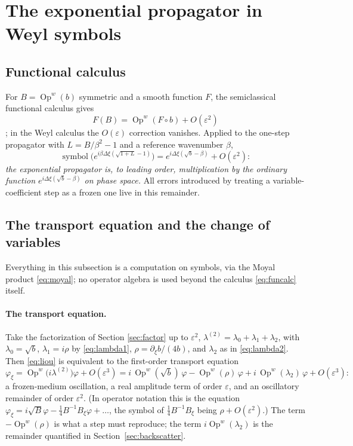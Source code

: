 \documentclass[11pt]{article}
\newcommand{\pd}{\partial}
\newcommand{\Op}{\operatorname{Op}^w}
\begin{document}
\section{The exponential propagator in Weyl symbols}\label{sec:propagator}

\subsection{Functional calculus}
For $B=\Op(b)$ symmetric and a smooth function $F$, the semiclassical
functional calculus gives
\begin{equation}\label{eq:funcalc}
F(B)=\Op\!\left(F\circ b\right)+O(\varepsilon^2)
\end{equation}
\cite{helffer,dimassi}; in the Weyl calculus the $O(\varepsilon)$ correction
vanishes. Applied to the one-step propagator with $L=B/\beta^2-1$ and a
reference wavenumber $\beta$,
\begin{equation}\label{eq:expsymbol}
\operatorname{symbol}\bigl(e^{i\beta\Delta\xi(\sqrt{1+L}-1)}\bigr)
=e^{i\Delta\xi(\sqrt b-\beta)}+O(\varepsilon^2):
\end{equation}
\emph{the exponential propagator is, to leading order, multiplication by the
ordinary function $e^{i\Delta\xi(\sqrt b-\beta)}$ on phase space.} All errors
introduced by treating a variable-coefficient step as a frozen one live in
this remainder.

\subsection{The transport equation and the change of variables}
Everything in this subsection is a computation on symbols, via the Moyal
product \eqref{eq:moyal}; no operator algebra is used beyond the calculus
\eqref{eq:funcalc} itself.

\paragraph{The transport equation.} Take the factorization of Section
\ref{sec:factor} up to $\varepsilon^2$,
$\lambda^{(2)}=\lambda_0+\lambda_1+\lambda_2$, with
$\lambda_0=\sqrt b$, $\lambda_1=i\rho$ by \eqref{eq:lambda1},
$\rho=\pd_\xi b/(4b)$, and $\lambda_2$ as in \eqref{eq:lambda2}. Then
\eqref{eq:liou} is equivalent to the first-order transport equation
\begin{equation}\label{eq:transport}
\varphi_\xi=\Op\bigl(i\lambda^{(2)}\bigr)\varphi+O(\varepsilon^3)
=i\,\Op(\sqrt b)\,\varphi-\Op(\rho)\,\varphi+i\,\Op(\lambda_2)\,\varphi
+O(\varepsilon^3):
\end{equation}
a frozen-medium oscillation, a real amplitude term of order $\varepsilon$,
and an oscillatory remainder of order $\varepsilon^2$. (In operator notation
this is the equation
$\varphi_\xi=i\sqrt B\varphi-\tfrac14B^{-1}B_\xi\varphi+\dots$, the symbol
of $\tfrac14B^{-1}B_\xi$ being $\rho+O(\varepsilon^2)$.) The term
$-\Op(\rho)$ is what a step must reproduce; the term $i\Op(\lambda_2)$ is
the remainder quantified in Section~\ref{sec:backscatter}.
\end{document}
